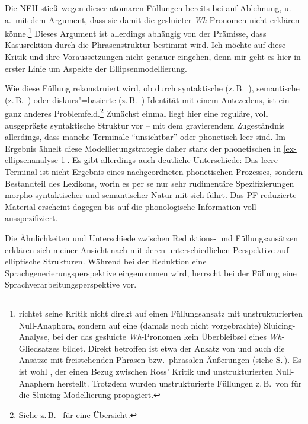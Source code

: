 Die NEH stie\ss\ wegen dieser atomaren Füllungen bereits bei \cite{Ross:69} auf Ablehnung, u.\,a.\ mit dem Argument, dass sie damit die  gesluicter \textit{Wh}-Pronomen nicht erklären könne.\footnote{\cite{Ross:69} richtet seine Kritik nicht direkt auf einen Füllungsansatz mit unstrukturierten Null-Anaphora, sondern auf eine (damals noch nicht vorgebrachte) Sluicing-Analyse, bei der das gesluicte \textit{Wh}-Pronomen kein Überbleibsel eines \textit{Wh}-Gliedsatzes bildet. Direkt betroffen ist etwa der Ansatz von \cite{Riemsdijk:78} und auch die Ansätze mit freistehenden Phrasen bzw.\ phrasalen Äu\ss erungen (siehe S.\,\pageref{ex-freistehende-phrasen}). Es ist wohl \cite{Wasow:72}, der einen Bezug zwischen Ross' Kritik und unstrukturierten Null-Anaphern herstellt. Trotzdem wurden unstrukturierte Füllungen z.\,B.\ von \cite{Chung:etal:95} für die Sluicing-Modellierung propagiert. } Dieses Argument ist allerdings abhängig von der Prämisse, dass Kasusrektion durch die Phrasenstruktur bestimmt wird. Ich möchte auf diese Kritik und ihre Voraussetzungen nicht genauer eingehen, denn mir geht es hier in erster Linie um Aspekte der Ellipsenmodellierung. 
 
Wie diese Füllung rekonstruiert wird, ob durch syntaktische (z.\,B.\ \citealt{Fiengo:May:94,Chung:etal:95}), semantische (z.\,B.\ \citealt{Dalrymple:etal:91}) oder diskurs"=basierte (z.\,B.\ \citealt{Hardt:93,Hardt:99,Hardt:Romero:04}) Identität mit einem Antezedens, ist ein ganz anderes Problemfeld.\footnote{Siehe z.\,B.\ \citet[Kapitel~3]{Schlangen:03} für eine Übersicht.} Zunächst einmal liegt hier eine reguläre, voll ausgeprägte syntaktische Struktur vor -- mit dem gravierendem Zugeständnis allerdings, dass manche Terminale "`unsichtbar"' oder phonetisch leer sind. Im Ergebnis ähnelt diese Modellierungstrategie daher stark der phonetischen  in \ref{ex-ellipsenanalyse-1}. Es gibt allerdings auch deutliche Unterschiede: Das leere Terminal ist nicht Ergebnis eines nachgeordneten phonetischen Prozesses, sondern Bestandteil des Lexikons, worin es per se nur sehr rudimentäre Spezifizierungen morpho-syntaktischer und semantischer Natur mit sich führt. Das PF-reduzierte Material erscheint dagegen bis auf die phonologische Information voll ausspezifiziert. 

Die Ähnlichkeiten und Unterschiede zwischen Reduktions- und Füllungsansätzen erklären sich meiner Ansicht nach mit deren unterschiedlichen Perspektive auf elliptische Strukturen. Während bei der Reduktion eine Sprachgenerierungsperspektive eingenommen wird, herrscht bei der Füllung eine Sprachverarbeitungsperspektive vor.

